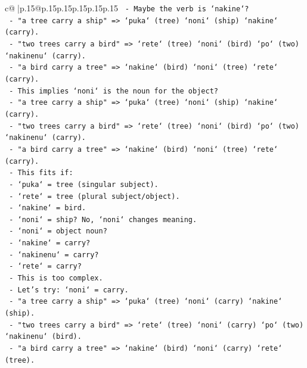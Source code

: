 \documentclass{article}
\begin{document}
{\begin{supertabular}{c@{$\;$}|p{.15\linewidth}@{}p{.15\linewidth}p{.15\linewidth}p{.15\linewidth}p{.15\linewidth}p{.15\linewidth}}
{{{\texttt{                    {-} Maybe the verb is `nakine`?} \\
\texttt{                    {-} "a tree carry a ship" => `puka` (tree) `noni` (ship) `nakine` (carry).} \\
\texttt{                    {-} "two trees carry a bird" => `rete` (tree) `noni` (bird) `po` (two) `nakinenu` (carry).} \\
\texttt{                    {-} "a bird carry a tree" => `nakine` (bird) `noni` (tree) `rete` (carry).} \\
\texttt{                    {-} This implies `noni` is the noun for the object?} \\
\texttt{                    {-} "a tree carry a ship" => `puka` (tree) `noni` (ship) `nakine` (carry).} \\
\texttt{                    {-} "two trees carry a bird" => `rete` (tree) `noni` (bird) `po` (two) `nakinenu` (carry).} \\
\texttt{                    {-} "a bird carry a tree" => `nakine` (bird) `noni` (tree) `rete` (carry).} \\
\texttt{                    {-} This fits if:} \\
\texttt{                      {-} `puka` = tree (singular subject).} \\
\texttt{                      {-} `rete` = tree (plural subject/object).} \\
\texttt{                      {-} `nakine` = bird.} \\
\texttt{                      {-} `noni` = ship? No, `noni` changes meaning.} \\
\texttt{                      {-} `noni` = object noun?} \\
\texttt{                      {-} `nakine` = carry?} \\
\texttt{                      {-} `nakinenu` = carry?} \\
\texttt{                      {-} `rete` = carry?} \\
\texttt{                    {-} This is too complex.} \\
\texttt{                    {-} Let's try: `noni` = carry.} \\
\texttt{                    {-} "a tree carry a ship" => `puka` (tree) `noni` (carry) `nakine` (ship).} \\
\texttt{                    {-} "two trees carry a bird" => `rete` (tree) `noni` (carry) `po` (two) `nakinenu` (bird).} \\
\texttt{                    {-} "a bird carry a tree" => `nakine` (bird) `noni` (carry) `rete` (tree).} \\
}}}
\end{supertabular}}
\end{document}
